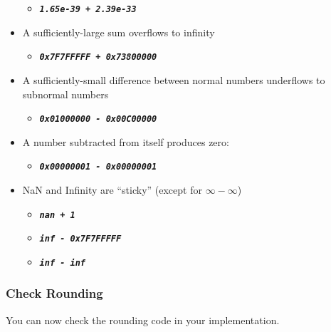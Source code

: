 \begin{itemize}
\begin{itemize}
        \item[] \texttt{\textbf{\textit{1.65e-39 + 2.39e-33}}}
    \end{itemize}
    \item A sufficiently-large sum overflows to infinity
    \begin{itemize}
        \item[] \texttt{\textbf{\textit{0x7F7FFFFF + 0x73800000}}}
    \end{itemize}
    \item A sufficiently-small difference between normal numbers underflows to subnormal numbers
    \begin{itemize}
        \item[] \texttt{\textbf{\textit{0x01000000 - 0x00C00000}}}
    \end{itemize}
    \item A number subtracted from itself produces zero:
    \begin{itemize}
        \item[] \texttt{\textbf{\textit{0x00000001 - 0x00000001}}}
    \end{itemize}
    \item NaN and Infinity are ``sticky'' (except for $\infty - \infty$)
    \begin{itemize}
        \item[] \texttt{\textbf{\textit{nan + 1}}}
        \item[] \texttt{\textbf{\textit{inf - 0x7F7FFFFF}}}
        \item[] \texttt{\textbf{\textit{inf - inf}}}
    \end{itemize}
\end{itemize}


\subsubsection*{Check Rounding}

You can now check the rounding code in your  implementation.

